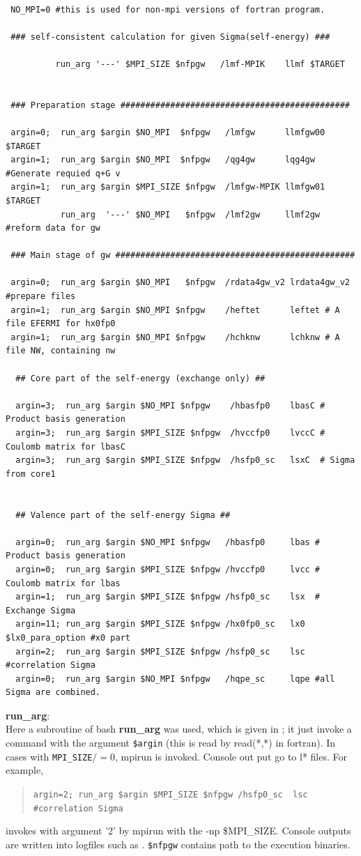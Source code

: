 {\baselineskip=2.8mm
\begin{verbatim}

 NO_MPI=0 #this is used for non-mpi versions of fortran program.

 ### self-consistent calculation for given Sigma(self-energy) ###

          run_arg '---' $MPI_SIZE $nfpgw   /lmf-MPIK    llmf $TARGET


 ### Preparation stage ##############################################

 argin=0;  run_arg $argin $NO_MPI  $nfpgw   /lmfgw      llmfgw00 $TARGET 
 argin=1;  run_arg $argin $NO_MPI  $nfpgw   /qg4gw      lqg4gw   #Generate requied q+G v
 argin=1;  run_arg $argin $MPI_SIZE $nfpgw  /lmfgw-MPIK llmfgw01 $TARGET
           run_arg  '---' $NO_MPI   $nfpgw  /lmf2gw     llmf2gw  #reform data for gw

 ### Main stage of gw ################################################

 argin=0;  run_arg $argin $NO_MPI   $nfpgw  /rdata4gw_v2 lrdata4gw_v2 #prepare files
 argin=1;  run_arg $argin $NO_MPI $nfpgw    /heftet      leftet # A file EFERMI for hx0fp0
 argin=1;  run_arg $argin $NO_MPI $nfpgw    /hchknw      lchknw # A file NW, containing nw 

  ## Core part of the self-energy (exchange only) ##

  argin=3;  run_arg $argin $NO_MPI $nfpgw    /hbasfp0    lbasC # Product basis generation 
  argin=3;  run_arg $argin $MPI_SIZE $nfpgw  /hvccfp0    lvccC # Coulomb matrix for lbasC 
  argin=3;  run_arg $argin $MPI_SIZE $nfpgw  /hsfp0_sc   lsxC  # Sigma from core1


  ## Valence part of the self-energy Sigma ##

  argin=0;  run_arg $argin $NO_MPI $nfpgw   /hbasfp0     lbas # Product basis generation 
  argin=0;  run_arg $argin $MPI_SIZE $nfpgw /hvccfp0     lvcc # Coulomb matrix for lbas 
  argin=1;  run_arg $argin $MPI_SIZE $nfpgw /hsfp0_sc    lsx  # Exchange Sigma
  argin=11; run_arg $argin $MPI_SIZE $nfpgw /hx0fp0_sc   lx0 $lx0_para_option #x0 part
  argin=2;  run_arg $argin $MPI_SIZE $nfpgw /hsfp0_sc    lsc  #correlation Sigma
  argin=0;  run_arg $argin $NO_MPI $nfpgw   /hqpe_sc     lqpe #all Sigma are combined.

\end{verbatim}
}
{\bf run\_arg}:\\ 

Here a subroutine of bash {\bf run\_arg} was used, which is given in ;
it just invoke a command with the argument \verb#$argin# (this is read by
read(*,*) in fortran). In cases with \verb#MPI_SIZE#$/=0$, 
mpirun is invoked. Console out
put go to l* files. For example,
\begin{quote}
\verb!argin=2; run_arg $argin $MPI_SIZE $nfpgw /hsfp0_sc  lsc #correlation Sigma!
\end{quote}
invokes  with argument '2' by mpirun with the -np
\$MPI\_SIZE. Console outputs are written into logfiles such as .
\verb#$nfpgw# contains path to the execution binaries.\\

